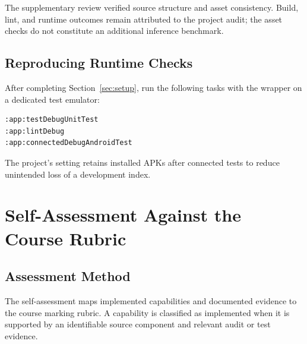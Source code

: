 \documentclass[11pt,a4paper]{article}
\newcommand{\reportsection}[1]{\section{#1}}
\begin{document}
The supplementary review verified source structure and asset consistency. Build, lint, and runtime outcomes remain attributed to the project audit; the asset checks do not constitute an additional inference benchmark.

\subsection{Reproducing Runtime Checks}
After completing Section~\ref{sec:setup}, run the following tasks with the wrapper on a dedicated test emulator:
\begin{verbatim}
:app:testDebugUnitTest
:app:lintDebug
:app:connectedDebugAndroidTest
\end{verbatim}
The project's  setting retains installed APKs after connected tests to reduce unintended loss of a development index.


\reportsection{Self-Assessment Against the Course Rubric}

\subsection{Assessment Method}
The self-assessment maps implemented capabilities and documented evidence to the course marking rubric. 
A capability is classified as implemented when it is supported by an identifiable source component and relevant audit or test evidence.
\end{document}
